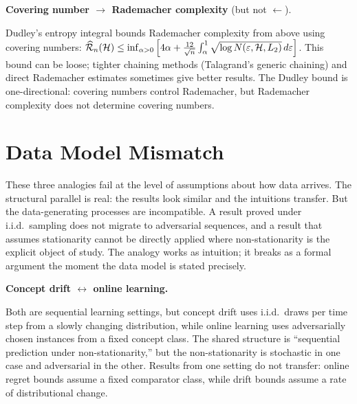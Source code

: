 \begin{obstbox}
\textbf{Covering number $\rightarrow$ Rademacher complexity} (but not
$\leftarrow$).

\medskip\noindent
Dudley's entropy integral bounds Rademacher complexity from above using
covering numbers: $\widehat{\mathcal{R}}_n(\mathcal{H}) \leq \inf_{\alpha > 0}
\left[ 4\alpha + \frac{12}{\sqrt{n}} \int_\alpha^1
\sqrt{\log N(\varepsilon, \mathcal{H}, L_2)} \, d\varepsilon \right]$.
This bound can be loose; tighter chaining methods (Talagrand's generic
chaining) and direct Rademacher estimates sometimes give better results.
The Dudley bound is one-directional: covering numbers control
Rademacher, but Rademacher complexity does not determine covering
numbers.
\end{obstbox}



\section{Data Model Mismatch}
\label{sec:data-model}

These three analogies fail at the level of assumptions about how data
arrives. The structural parallel is real: the results look similar and the
intuitions transfer. But the data-generating processes are incompatible.
A result proved under i.i.d.\ sampling does not migrate to adversarial
sequences, and a result that assumes stationarity cannot be directly applied
where non-stationarity is the explicit object of study. The analogy works
as intuition; it breaks as a formal argument the moment the data model is
stated precisely.

\begin{obstbox}
\textbf{Concept drift $\leftrightarrow$ online learning.}

\medskip\noindent
Both are sequential learning settings, but concept drift uses i.i.d.\
draws per time step from a slowly changing distribution, while online
learning uses adversarially chosen instances from a fixed concept class.
The shared structure is ``sequential prediction under non-stationarity,''
but the non-stationarity is stochastic in one case and adversarial in
the other. Results from one setting do not transfer: online regret
bounds assume a fixed comparator class, while drift bounds assume a
rate of distributional change.
\end{obstbox}

